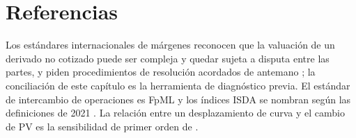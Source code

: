 \section{Referencias}\label{sec:cap11-referencias}

Los estándares internacionales de márgenes reconocen que la valuación de un derivado no cotizado puede ser compleja y quedar sujeta a disputa entre las partes, y piden procedimientos de resolución acordados de antemano \citep[apartado~3.15]{bcbs2015}; la conciliación de este capítulo es la herramienta de diagnóstico previa. El estándar de intercambio de operaciones es FpML \citep{fpml2026} y los índices ISDA se nombran según las definiciones de 2021 \citep{isda2021}. La relación entre un desplazamiento de curva y el cambio de PV es la sensibilidad de primer orden de \citet{hull2018}.
